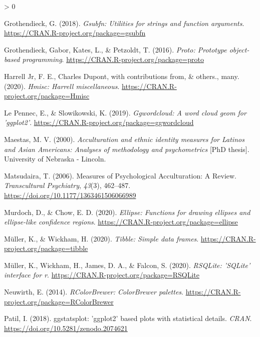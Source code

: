 \documentclass[
  american,
  man]{apa7}
\newlength{\cslhangindent}
\newenvironment{CSLReferences}[2] %
 {%
  \setlength{\parindent}{0pt}
  \ifodd #1 \everypar{\setlength{\hangindent}{\cslhangindent}}\ignorespaces\fi
  \ifnum #2 > 0
  \setlength{\parskip}{#2\baselineskip}
  \fi
 }%
 {}
\begin{document}
\begin{CSLReferences}{1}{0}
\leavevmode\hypertarget{ref-R-gsubfn}{}%
Grothendieck, G. (2018). \emph{Gsubfn: Utilities for strings and function arguments}. \url{https://CRAN.R-project.org/package=gsubfn}

\leavevmode\hypertarget{ref-R-proto}{}%
Grothendieck, Gabor, Kates, L., \& Petzoldt, T. (2016). \emph{Proto: Prototype object-based programming}. \url{https://CRAN.R-project.org/package=proto}

\leavevmode\hypertarget{ref-R-Hmisc}{}%
Harrell Jr, F. E., Charles Dupont, with contributions from, \& others., many. (2020). \emph{Hmisc: Harrell miscellaneous}. \url{https://CRAN.R-project.org/package=Hmisc}

\leavevmode\hypertarget{ref-R-ggwordcloud}{}%
Le Pennec, E., \& Slowikowski, K. (2019). \emph{Ggwordcloud: A word cloud geom for 'ggplot2'}. \url{https://CRAN.R-project.org/package=ggwordcloud}

\leavevmode\hypertarget{ref-Maestas2000}{}%
Maestas, M. V. (2000). \emph{{Acculturation and ethnic identity measures for Latinos and Asian Americans: Analyses of methodology and psychometrics}} {[}PhD thesis{]}. University of Nebraska - Lincoln.

\leavevmode\hypertarget{ref-Matsudaira2006}{}%
Matsudaira, T. (2006). {Measures of Psychological Acculturation: A Review}. \emph{Transcultural Psychiatry}, \emph{43}(3), 462--487. \url{https://doi.org/10.1177/1363461506066989}

\leavevmode\hypertarget{ref-R-ellipse}{}%
Murdoch, D., \& Chow, E. D. (2020). \emph{Ellipse: Functions for drawing ellipses and ellipse-like confidence regions}. \url{https://CRAN.R-project.org/package=ellipse}

\leavevmode\hypertarget{ref-R-tibble}{}%
Müller, K., \& Wickham, H. (2020). \emph{Tibble: Simple data frames}. \url{https://CRAN.R-project.org/package=tibble}

\leavevmode\hypertarget{ref-R-RSQLite}{}%
Müller, K., Wickham, H., James, D. A., \& Falcon, S. (2020). \emph{RSQLite: 'SQLite' interface for r}. \url{https://CRAN.R-project.org/package=RSQLite}

\leavevmode\hypertarget{ref-R-RColorBrewer}{}%
Neuwirth, E. (2014). \emph{RColorBrewer: ColorBrewer palettes}. \url{https://CRAN.R-project.org/package=RColorBrewer}

\leavevmode\hypertarget{ref-R-ggstatsplot}{}%
Patil, I. (2018). {ggstatsplot}: 'ggplot2' based plots with statistical details. \emph{CRAN}. \url{https://doi.org/10.5281/zenodo.2074621}


\end{CSLReferences}
\end{document}
